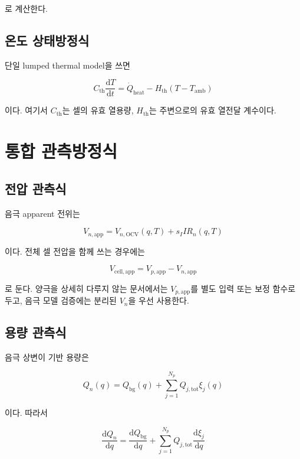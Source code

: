 \documentclass[11pt,a4paper]{article}
\newcommand{\dd}{\mathrm{d}}
\newcommand{\OCV}{\mathrm{OCV}}
\newcommand{\app}{\mathrm{app}}
\newcommand{\tot}{\mathrm{tot}}
\newcommand{\bg}{\mathrm{bg}}
\begin{document}
로 계산한다.

\subsection{온도 상태방정식}
단일 lumped thermal model을 쓰면

\begin{equation}
C_{\mathrm{th}}\frac{\dd T}{\dd t}=\dot Q_{\mathrm{heat}}-H_{\mathrm{th}}(T-T_{\mathrm{amb}})
\label{eq:v4_state_T}
\end{equation}

이다. 여기서 \(C_{\mathrm{th}}\)는 셀의 유효 열용량, \(H_{\mathrm{th}}\)는 주변으로의 유효 열전달 계수이다.

\section{통합 관측방정식}
\subsection{전압 관측식}
음극 apparent 전위는

\begin{equation}
V_{n,\app}=V_{n,\OCV}(q,T)+s_IIR_n(q,T)
\label{eq:v4_obs_vn}
\end{equation}

이다. 전체 셀 전압을 함께 쓰는 경우에는

\begin{equation}
V_{\mathrm{cell},\app}=V_{p,\app}-V_{n,\app}
\label{eq:v4_obs_cellv}
\end{equation}

로 둔다. 양극을 상세히 다루지 않는 문서에서는 \(V_{p,\app}\)를 별도 입력 또는 보정 함수로 두고, 음극 모델 검증에는 분리된 \(V_n\)을 우선 사용한다.

\subsection{용량 관측식}
음극 상변이 기반 용량은

\begin{equation}
Q_n(q)=Q_{\bg}(q)+\sum_{j=1}^{N_p}Q_{j,\tot}\xi_j(q)
\label{eq:v4_obs_Qn}
\end{equation}

이다. 따라서

\begin{equation}
\frac{\dd Q_n}{\dd q}=\frac{\dd Q_{\bg}}{\dd q}+\sum_{j=1}^{N_p}Q_{j,\tot}\frac{\dd\xi_j}{\dd q}
\label{eq:v4_obs_dQdq}
\end{equation}
\end{document}
